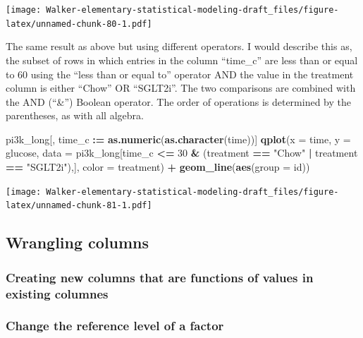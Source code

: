 \documentclass[]{book}
\newenvironment{Shaded}{\begin{snugshade}}{\end{snugshade}}
\newcommand{\DataTypeTok}[1]{\textcolor[rgb]{0.13,0.29,0.53}{#1}}
\newcommand{\DecValTok}[1]{\textcolor[rgb]{0.00,0.00,0.81}{#1}}
\newcommand{\ErrorTok}[1]{\textcolor[rgb]{0.64,0.00,0.00}{\textbf{#1}}}
\newcommand{\KeywordTok}[1]{\textcolor[rgb]{0.13,0.29,0.53}{\textbf{#1}}}
\newcommand{\NormalTok}[1]{#1}
\newcommand{\OperatorTok}[1]{\textcolor[rgb]{0.81,0.36,0.00}{\textbf{#1}}}
\newcommand{\StringTok}[1]{\textcolor[rgb]{0.31,0.60,0.02}{#1}}
\begin{document}
\texttt{[image: Walker-elementary-statistical-modeling-draft\_files/figure-latex/unnamed-chunk-80-1.pdf]}

The same result as above but using different operators. I would describe this as, the subset of rows in which entries in the column ``time\_c'' are less than or equal to 60 using the ``less than or equal to'' operator AND the value in the treatment column is either ``Chow'' OR ``SGLT2i''. The two comparisons are combined with the AND (``\&'') Boolean operator. The order of operations is determined by the parentheses, as with all algebra.

\begin{Shaded}
\begin{Highlighting}[]
\NormalTok{pi3k_long[, time_c }\OperatorTok{:}\ErrorTok{=}\StringTok{ }\KeywordTok{as.numeric}\NormalTok{(}\KeywordTok{as.character}\NormalTok{(time))]}
\KeywordTok{qplot}\NormalTok{(}\DataTypeTok{x =}\NormalTok{ time,}
      \DataTypeTok{y =}\NormalTok{ glucose,}
      \DataTypeTok{data =}\NormalTok{ pi3k_long[time_c }\OperatorTok{<=}\StringTok{ }\DecValTok{30} \OperatorTok{&}\StringTok{ }\NormalTok{(treatment }\OperatorTok{==}\StringTok{ "Chow"} \OperatorTok{|}\StringTok{ }\NormalTok{treatment }\OperatorTok{==}\StringTok{ "SGLT2i"}\NormalTok{),],}
      \DataTypeTok{color =}\NormalTok{ treatment) }\OperatorTok{+}
\StringTok{  }\KeywordTok{geom_line}\NormalTok{(}\KeywordTok{aes}\NormalTok{(}\DataTypeTok{group =}\NormalTok{ id))}
\end{Highlighting}
\end{Shaded}

\texttt{[image: Walker-elementary-statistical-modeling-draft\_files/figure-latex/unnamed-chunk-81-1.pdf]}

\hypertarget{wrangling-columns}{%
\subsection{Wrangling columns}\label{wrangling-columns}}

\hypertarget{creating-new-columns-that-are-functions-of-values-in-existing-columnes}{%
\subsubsection{Creating new columns that are functions of values in existing columnes}\label{creating-new-columns-that-are-functions-of-values-in-existing-columnes}}

\hypertarget{change-the-reference-level-of-a-factor}{%
\subsubsection{Change the reference level of a factor}\label{change-the-reference-level-of-a-factor}}
\end{document}
